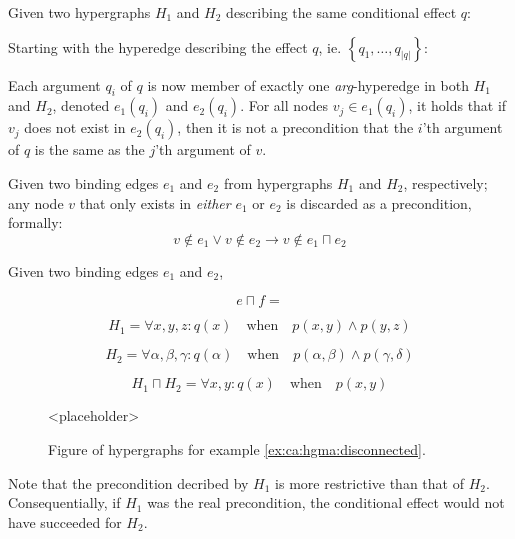 \documentclass[../Master.tex]{subfiles}
\begin{document}
Given two hypergraphs $H_1$ and $H_2$ describing the same conditional effect $q$:

Starting with the hyperedge describing the effect $q$, ie. $\left\{ q_1, \dots, q_{|q|}  \right\}$:

Each argument $q_i$ of $q$ is now member of exactly one \emph{arg}-hyperedge in  both $H_1$ and $H_2$, denoted $e_1(q_i)$ and $e_2(q_i)$. For all nodes $v_j \in e_1(q_i)$, it holds that  if $v_j$ does not exist in $e_2(q_i)$, then it is not a precondition that the $i$'th argument of $q$ is the same as the $j$'th argument of $v$.

\begin{proposition}
    Given two binding edges $e_1$ and $e_2$ from hypergraphs $H_1$ and $H_2$, respectively; any node $v$ that only exists in \emph{either} $e_1$ or $e_2$ is discarded as a precondition, formally:
    \begin{equation*}
        v \notin e_1 \lor v \notin e_2 \rightarrow v \notin e_1 \sqcap e_2
    \end{equation*}
\end{proposition}

\begin{proposition}
    Given two binding edges $e_1$ and $e_2$,
\end{proposition}

\begin{equation}
    e \sqcap f = 
\end{equation}

\begin{example} \label{ex:ca:hgma:disconnected}
    \begin{equation*}
        H_1 = \forall x, y, z : q(x) \quad \text{when} \quad
            p(x,y) \land p(y, z)
    \end{equation*}

    \begin{equation*}
        H_2 = \forall \alpha, \beta, \gamma : q(\alpha) \quad \text{when} \quad
            p(\alpha, \beta) \land p(\gamma, \delta)
    \end{equation*}

    \begin{equation*}
        H_1 \sqcap H_2 = \forall x, y : q(x) \quad \text{when} \quad p(x, y)
    \end{equation*}

    \begin{figure}
        <placeholder>
        \caption{\label{fig:ex:ca:hgma:ex:disconnected} Figure of hypergraphs for example \ref{ex:ca:hgma:disconnected}.}
    \end{figure}

    Note that the precondition decribed by $H_1$ is more restrictive than that of $H_2$. Consequentially, if $H_1$ was the real precondition, the conditional effect would not have succeeded for $H_2$.
\end{example}
\end{document}
